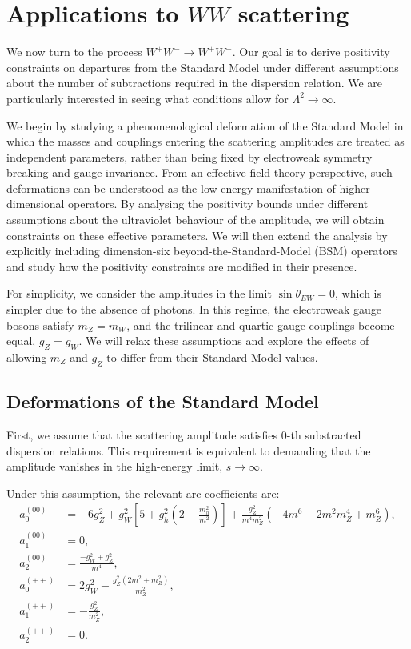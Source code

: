 \chapter{Applications to $WW$ scattering}
\label{chap:ww}
We now turn to the process $W^+ W^- \to W^+ W^-$. Our goal is to derive positivity constraints on departures from the Standard Model under different assumptions about the number of subtractions required in the dispersion relation. We are particularly interested in seeing what conditions allow for $\Lambda^2 \to \infty$.

We begin by studying a phenomenological deformation of the Standard Model in which the masses and couplings entering the scattering amplitudes are treated as independent parameters, rather than being fixed by electroweak symmetry breaking and gauge invariance. From an effective field theory perspective, such deformations can be understood as the low-energy manifestation of higher-dimensional operators. By analysing the positivity bounds under different assumptions about the ultraviolet behaviour of the amplitude, we will obtain constraints on these effective parameters.
We will then extend the analysis by explicitly including dimension-six beyond-the-Standard-Model (BSM) operators and study how the positivity constraints are modified in their presence.

For simplicity, we consider the amplitudes in the limit $\sin\theta_{EW}=0$, which is simpler due to the absence of photons. In this regime, the electroweak gauge bosons satisfy $m_Z = m_W$, and the trilinear and quartic gauge couplings become equal, $g_Z = g_W$. We will relax these assumptions and explore the effects of allowing $m_Z$ and $g_Z$ to differ from their Standard Model values.

\section{Deformations of the Standard Model}

First, we assume that the scattering amplitude satisfies $0$-th substracted dispersion relations. This requirement is equivalent to demanding that the amplitude vanishes in the high-energy limit, \( s \to \infty \).

Under this assumption, the relevant arc coefficients are:
\begin{align}
    a_0^{(00)} &= -6 g_Z^2 + g_W^2 \left[ 5 + g_h^2 \left( 2 - \frac{m_h^2}{m^2} \right) \right] 
    + \frac{g_Z^2}{m^4 m_Z^2} \left(-4m^6 - 2m^2 m_Z^4 + m_Z^6 \right), \\
    a_1^{(00)} &= 0, \\
    a_2^{(00)} &= \frac{-g_W^2 + g_Z^2}{m^4}, \\
    a_0^{(++)} &= 2g_W^2 - \frac{g_Z^2 (2m^2 + m_Z^2)}{m_Z^2}, \\
    a_1^{(++)} &= - \frac{g_Z^2}{m_Z^2}, \\
    a_2^{(++)} &= 0.
\end{align}

